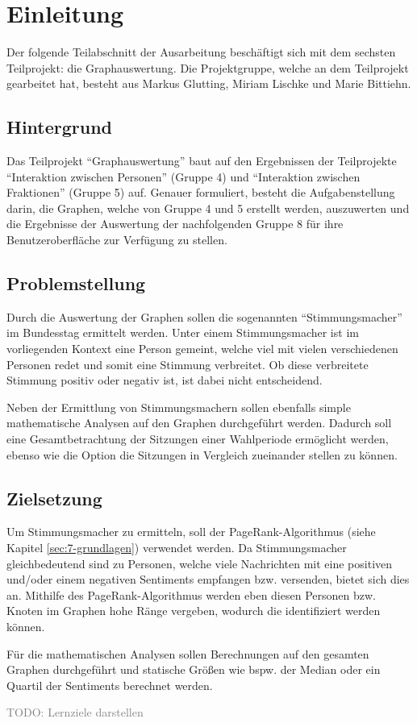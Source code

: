 \section{Einleitung}

Der folgende Teilabschnitt der Ausarbeitung beschäftigt sich mit dem sechsten Teilprojekt: die Graphauswertung. Die Projektgruppe, welche an dem Teilprojekt gearbeitet hat, besteht aus Markus Glutting, Miriam Lischke und Marie Bittiehn.

\subsection{Hintergrund}
Das Teilprojekt ``Graphauswertung'' baut auf den Ergebnissen der Teilprojekte ``Interaktion zwischen Personen'' (Gruppe 4) und ``Interaktion zwischen Fraktionen'' (Gruppe 5) auf. Genauer formuliert, besteht die Aufgabenstellung darin, die Graphen, welche von Gruppe 4 und 5 erstellt werden, auszuwerten und die Ergebnisse der Auswertung der nachfolgenden Gruppe 8 für ihre Benutzeroberfläche zur Verfügung zu stellen.

\subsection{Problemstellung}
Durch die Auswertung der Graphen sollen die sogenannten ``Stimmungsmacher'' im Bundesstag ermittelt werden. Unter einem Stimmungsmacher ist im vorliegenden Kontext eine Person gemeint, welche viel mit vielen verschiedenen Personen redet und somit eine Stimmung verbreitet. Ob diese verbreitete Stimmung positiv oder negativ ist, ist dabei nicht entscheidend. 

Neben der Ermittlung von Stimmungsmachern sollen ebenfalls simple mathematische Analysen auf den Graphen durchgeführt werden. Dadurch soll eine Gesamtbetrachtung der Sitzungen einer Wahlperiode ermöglicht werden, ebenso wie die Option die Sitzungen in Vergleich zueinander stellen zu können.

\subsection{Zielsetzung}

Um Stimmungsmacher zu ermitteln, soll der PageRank-Algorithmus (siehe Kapitel \ref{sec:7-grundlagen}) verwendet werden. Da Stimmungsmacher gleichbedeutend sind zu Personen, welche viele Nachrichten mit eine positiven und/oder einem negativen Sentiments empfangen bzw. versenden, bietet sich dies an. Mithilfe des PageRank-Algorithmus werden eben diesen Personen bzw. Knoten im Graphen hohe Ränge vergeben, wodurch die identifiziert werden können.

Für die mathematischen Analysen sollen Berechnungen auf den gesamten Graphen durchgeführt und statische Größen wie bspw. der Median oder ein Quartil der Sentiments berechnet werden. 

\textcolor{gray}{TODO: Lernziele darstellen}